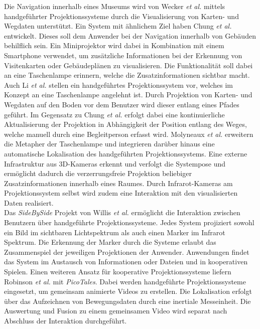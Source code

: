 Die Navigation innerhalb eines Museums wird von Wecker \textit{et al.} \cite{Wecker2013} mittels handgeführter Projektionssysteme durch die Visualisierung von Karten- und Wegdaten unterstützt. Ein System mit ähnlichem Ziel haben Chung \textit{et al.} \cite{Chung2011} entwickelt. Dieses soll dem Anwender bei der Navigation innerhalb von Gebäuden behilflich sein. Ein Miniprojektor wird dabei in Kombination mit einem Smartphone verwendet, um zusätzliche Informationen bei der Erkennung von Visitenkarten oder Gebäudeplänen zu visualisieren. Die Funktionalität soll dabei an eine Taschenlampe erinnern, welche die Zusatzinformationen sichtbar macht. Auch Li \textit{et al.} \cite{Li2013} stellen ein handgeführtes Projektionssystem vor, welches im Konzept an eine Taschenlampe angelehnt ist. Durch Projektion von Karten- und Wegdaten auf den Boden vor dem Benutzer wird dieser entlang eines Pfades geführt. Im Gegensatz zu Chung \textit{et al.} erfolgt dabei eine kontinuierliche Aktualisierung der Projektion in Abhängigkeit der Position entlang des Weges, welche manuell durch eine Begleitperson erfasst wird. Molyneaux \textit{et al.} \cite{Molyneaux2012} erweitern die Metapher der Taschenlampe und integrieren darüber hinaus eine automatische Lokalisation des handgeführten Projektionssystems. Eine externe Infrastruktur aus 3D-Kameras erkennt und verfolgt die Systempose und ermöglicht dadurch die verzerrungsfreie Projektion beliebiger Zusatzinformationen innerhalb eines Raumes. Durch Infrarot-Kameras am Projektionssystem selbst wird zudem eine Interaktion mit den visualisierten Daten realisiert.\\

Das \textit{SideBySide} Projekt von Willis \textit{et al.} \cite{Willis2011} ermöglicht die Interaktion zwischen Benutzern über handgeführte Projektionssysteme. Jedes System projiziert sowohl ein Bild im sichtbaren Lichtspektrum als auch einen Marker im Infrarot Spektrum. Die Erkennung der Marker durch die Systeme erlaubt das Zusammenspiel der jeweiligen Projektionen der Anwender. Anwendungen findet das System im Austausch von Informationen oder Dateien und in kooperativen Spielen. Einen weiteren Ansatz für kooperative Projektionssysteme liefern Robinson \textit{et al.} \cite{Robinson2012} mit \textit{PicoTales}. Dabei werden handgeführte Projektionssysteme eingesetzt, um gemeinsam animierte Videos zu erstellen. Die Lokalisation erfolgt über das Aufzeichnen von Bewegungsdaten durch eine inertiale Messeinheit. Die Auswertung und Fusion zu einem gemeinsamen Video wird separat nach Abschluss der Interaktion durchgeführt.\\

